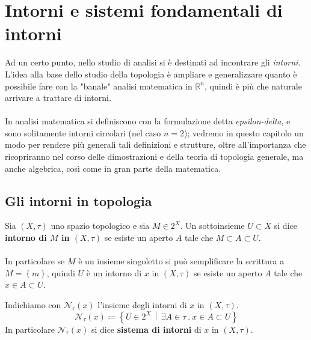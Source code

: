 \section{Intorni e sistemi fondamentali di intorni}
Ad un certo punto, nello studio di analisi si è destinati ad incontrare gli \textit{intorni}. \\ L'idea alla base dello studio della topologia è ampliare e generalizzare quanto è possibile fare con la "banale" analisi matematica in $\mathbb{R}^n$, quindi è più che naturale arrivare a trattare di intorni. \\ \\ In analisi matematica si definiscono con la formulazione detta \textit{epsilon-delta}, e sono solitamente intorni circolari (nel caso $n=2$); vedremo in questo capitolo un modo per rendere più generali tali definizioni e strutture, oltre all'importanza che ricopriranno nel corso delle dimostrazioni e della teoria di topologia generale, ma anche algebrica, così come in gran parte della matematica.


\subsection{\textcolor{TopGener}{\textbf{Gli intorni in topologia}}}




\begin{definition}
	Sia $(X,\tau)$ uno spazio topologico e sia $M \in 2^X$. Un sottoinsieme $U \subset X$ si dice \textbf{intorno di $M$ in $(X,\tau)$} se esiste un aperto $A$ tale che $M \subset A \subset U$. \\ \\ In particolare se $M$ è un insieme singoletto si può semplificare la scrittura a $M = \left\{m\right\}$, quindi $U$ è un intorno di $x$ in $(X,\tau)$ se esiste un aperto $A$ tale che $x \in A \subset U$.
\end{definition}

\begin{definition}
	Indichiamo con $\mathcal{N}_\tau(x)$ l'insieme degli intorni di $x$ in $(X,\tau)$. 
	\begin{equation*}
		\mathcal{N}_\tau(x) \coloneqq \left\{ U \in 2^X \,\middle|\, \exists A \in \tau\ .\ x \in A \subset U \right\}
	\end{equation*}
	In particolare $\mathcal{N}_\tau(x)$ si dice \textbf{sistema di intorni} di $x$ in $(X, \tau)$.
\end{definition}

